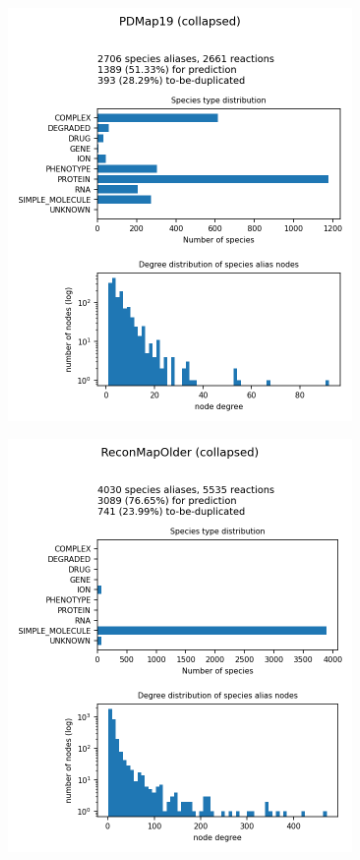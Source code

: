 \documentclass[
	fontsize=10pt, %
	twoside=true, %
	secnumdepth=1, %
  toc=indentunnumbered %
]{kaobook}
\begin{document}
\begin{figure}[h]
\begin{subfigure}{0.32\textwidth}
    \includegraphics[width=\linewidth]{generated/PDMap19.png}
  \end{subfigure} 
  \begin{subfigure}{0.32\textwidth}
    \includegraphics[width=\linewidth]{generated/ReconMapOlder.png}

\end{subfigure}
\end{figure}
\end{document}
